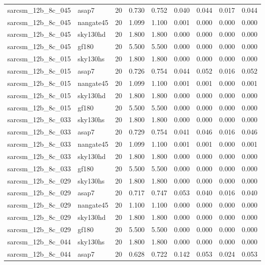 \begin{tabular}{llrrrrrrr}
sarcsm\_12b\_8c\_045 & asap7 & 20 & 0.730 & 0.752 & 0.040 & 0.044 & 0.017 & 0.044 \\
sarcsm\_12b\_8c\_045 & nangate45 & 20 & 1.099 & 1.100 & 0.001 & 0.000 & 0.000 & 0.000 \\
sarcsm\_12b\_8c\_045 & sky130hd & 20 & 1.800 & 1.800 & 0.000 & 0.000 & 0.000 & 0.000 \\
sarcsm\_12b\_8c\_045 & gf180 & 20 & 5.500 & 5.500 & 0.000 & 0.000 & 0.000 & 0.000 \\
sarcsm\_12b\_8c\_015 & sky130hs & 20 & 1.800 & 1.800 & 0.000 & 0.000 & 0.000 & 0.000 \\
sarcsm\_12b\_8c\_015 & asap7 & 20 & 0.726 & 0.754 & 0.044 & 0.052 & 0.016 & 0.052 \\
sarcsm\_12b\_8c\_015 & nangate45 & 20 & 1.099 & 1.100 & 0.001 & 0.001 & 0.000 & 0.001 \\
sarcsm\_12b\_8c\_015 & sky130hd & 20 & 1.800 & 1.800 & 0.000 & 0.000 & 0.000 & 0.000 \\
sarcsm\_12b\_8c\_015 & gf180 & 20 & 5.500 & 5.500 & 0.000 & 0.000 & 0.000 & 0.000 \\
sarcsm\_12b\_8c\_033 & sky130hs & 20 & 1.800 & 1.800 & 0.000 & 0.000 & 0.000 & 0.000 \\
sarcsm\_12b\_8c\_033 & asap7 & 20 & 0.729 & 0.754 & 0.041 & 0.046 & 0.016 & 0.046 \\
sarcsm\_12b\_8c\_033 & nangate45 & 20 & 1.099 & 1.100 & 0.001 & 0.001 & 0.000 & 0.001 \\
sarcsm\_12b\_8c\_033 & sky130hd & 20 & 1.800 & 1.800 & 0.000 & 0.000 & 0.000 & 0.000 \\
sarcsm\_12b\_8c\_033 & gf180 & 20 & 5.500 & 5.500 & 0.000 & 0.000 & 0.000 & 0.000 \\
sarcsm\_12b\_8c\_029 & sky130hs & 20 & 1.800 & 1.800 & 0.000 & 0.000 & 0.000 & 0.000 \\
sarcsm\_12b\_8c\_029 & asap7 & 20 & 0.717 & 0.747 & 0.053 & 0.040 & 0.016 & 0.040 \\
sarcsm\_12b\_8c\_029 & nangate45 & 20 & 1.100 & 1.100 & 0.000 & 0.000 & 0.000 & 0.000 \\
sarcsm\_12b\_8c\_029 & sky130hd & 20 & 1.800 & 1.800 & 0.000 & 0.000 & 0.000 & 0.000 \\
sarcsm\_12b\_8c\_029 & gf180 & 20 & 5.500 & 5.500 & 0.000 & 0.000 & 0.000 & 0.000 \\
sarcsm\_12b\_8c\_044 & sky130hs & 20 & 1.800 & 1.800 & 0.000 & 0.000 & 0.000 & 0.000 \\
sarcsm\_12b\_8c\_044 & asap7 & 20 & 0.628 & 0.722 & 0.142 & 0.053 & 0.024 & 0.053 \\

\end{tabular}
